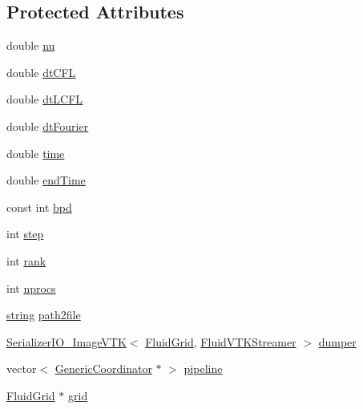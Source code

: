 \subsection*{Protected Attributes}
\begin{DoxyCompactItemize}
\item 
double \hyperlink{class_test_poiseuille_a9eba2815d196e8a68f1e55ccc1f49587}{nu}
\item 
double \hyperlink{class_test_poiseuille_a54e0785218e3e68132f9871f653867b7}{dt\+C\+F\+L}
\item 
double \hyperlink{class_test_poiseuille_a5ac66de31bd4568ddcf483b46d0b52aa}{dt\+L\+C\+F\+L}
\item 
double \hyperlink{class_test_poiseuille_aa08d9d6fe14efb0de6bd60ff6e4da1b0}{dt\+Fourier}
\item 
double \hyperlink{class_test_poiseuille_acdb73b1c2ed9990a25f8d312278f081f}{time}
\item 
double \hyperlink{class_test_poiseuille_a15f483bc7a330049328759a09b0a1c8a}{end\+Time}
\item 
const int \hyperlink{class_test_poiseuille_a368bcc1b6b25f4fde19cbfdb606403d9}{bpd}
\item 
int \hyperlink{class_test_poiseuille_a1849a5bb6d12f01b2bbf568c429315c0}{step}
\item 
int \hyperlink{class_test_poiseuille_a5d589cfd40e004bf1d43a774c6b4c872}{rank}
\item 
int \hyperlink{class_test_poiseuille_a95d28f5f8a1c178eb4a497a61cbf589b}{nprocs}
\item 
\hyperlink{testfpzip_8cpp_a984bb8e04129c4268bd6ff36a50c9fa4}{string} \hyperlink{class_test_poiseuille_a99086da8432f1ae5eb24d9647eef4c74}{path2file}
\item 
\hyperlink{class_serializer_i_o___image_v_t_k}{Serializer\+I\+O\+\_\+\+Image\+V\+T\+K}$<$ \hyperlink{_definitions_8h_aff3288a3741f5098bcc456bb13440189}{Fluid\+Grid}, \hyperlink{struct_fluid_v_t_k_streamer}{Fluid\+V\+T\+K\+Streamer} $>$ \hyperlink{class_test_poiseuille_a91f78c712e3c9181fe8c0c57c7a361a9}{dumper}
\item 
vector$<$ \hyperlink{class_generic_coordinator}{Generic\+Coordinator} $\ast$ $>$ \hyperlink{class_test_poiseuille_a4b10cfd21bf7e02533562baf700e6497}{pipeline}
\item 
\hyperlink{_definitions_8h_aff3288a3741f5098bcc456bb13440189}{Fluid\+Grid} $\ast$ \hyperlink{class_test_poiseuille_a6386bbb4b0e5cf8e57a1c6927f2571bc}{grid}
\end{DoxyCompactItemize}


